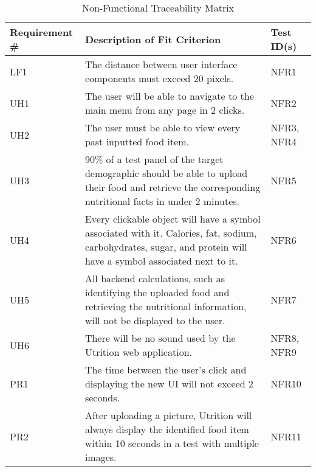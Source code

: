 \documentclass[12pt, titlepage]{article}
\begin{document}
	\begin{table}[H]
		\caption{Non-Functional Traceability Matrix}
		\begin{tabularx}{\textwidth}{|l|X|l|}
			\hline
			{\bf Requirement \#} & {\bf Description of Fit Criterion} & {\bf Test ID(s)}\\
			\hline
			LF1 & The distance between user interface components must exceed 20 pixels. & NFR1 \\
			\hline
			UH1 & The user will be able to navigate to the main menu from any page in 2 clicks. & NFR2 \\
			\hline
			UH2 & The user must be able to view every past inputted food item. & NFR3, NFR4 \\
			\hline
			UH3 & 90\% of a test panel of the target demographic should be able to upload their food and retrieve the corresponding nutritional facts in under 2 minutes. & NFR5 \\
			\hline
			UH4 & Every clickable object will have a symbol associated with it. Calories, fat, sodium, carbohydrates, sugar, and protein will have a symbol associated next to it.
			& NFR6 \\
			\hline
			UH5 & All backend calculations, such as identifying the uploaded food and retrieving the nutritional information, will not be displayed to the user. & NFR7 \\
			\hline
			UH6 & There will be no sound used by the Utrition web application.  & NFR8, NFR9 \\
			\hline
			PR1 & The time between the user’s click and displaying the new UI will not exceed 2 seconds. & NFR10 \\
			\hline
			PR2 & After uploading a picture, Utrition will always display the identified food item within 10 seconds in a test with multiple images. & NFR11 \\
			\hline
		\end{tabularx}
		\label{tab:Non-Functional Traceability}
	\end{table}
\end{document}

